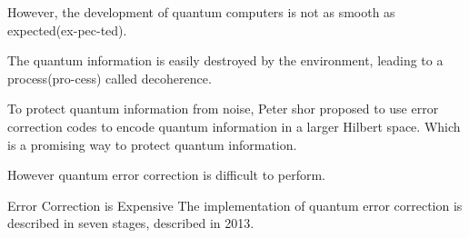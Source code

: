 \documentclass[10pt]{beamer}
\begin{document}
\begin{CJK}{UTF8}{gbsn}
{However, the development of quantum computers is not as smooth as expected(ex-pec-ted). 

The quantum information is easily destroyed by the environment, leading to a process(pro-cess) called decoherence.

To protect quantum information from noise, Peter shor proposed to use error correction codes to encode quantum information in a larger Hilbert space.
Which is a promising way to protect quantum information.


However quantum error correction is difficult to perform. %
}

\begin{frame}[fragile]{Error Correction is Expensive}
 The implementation of quantum error correction is described in seven stages, described in 2013. %
  \begin{figure}
\end{figure}
\end{frame}
\end{CJK}
\end{document}
